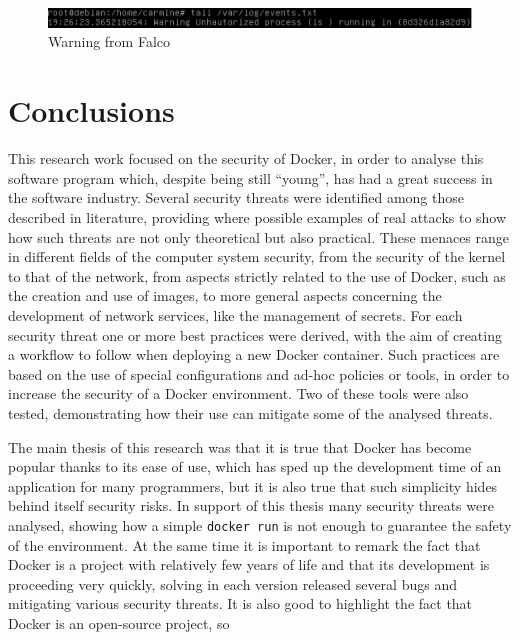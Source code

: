 \documentclass[a4paper,12pt]{article}
\newcommand{\code}[1]{\lstinline|#1|}
\begin{document}
\begin{figure}[ht!]
  \centerline{\includegraphics[width=1\textwidth]{falco_warn.png}}
  \caption{Warning from Falco}
  \label{fig:falco_warn}
\end{figure}
  
\newpage

\section{Conclusions}
\label{sec:conclusions}

This research work focused on the security of Docker, in order to analyse this
software program which, despite being still ``young'', has had a great success
in the software industry. Several security threats were identified among those
described in literature, providing where possible examples of real attacks to
show how such threats are not only theoretical but also practical. These menaces
range in different fields of the computer system security, from the security of
the kernel to that of the network, from aspects strictly related to the use of
Docker, such as the creation and use of images, to more general aspects
concerning the development of network services, like the management of secrets.
For each security threat one or more best practices were derived, with the aim
of creating a workflow to follow when deploying a new Docker container. Such
practices are based on the use of special configurations and ad-hoc policies or
tools, in order to increase the security of a Docker environment. Two of these
tools were also tested, demonstrating how their use can mitigate some of the
analysed threats. \par The main thesis of this research was that it is true that
Docker has become popular thanks to its ease of use, which has sped up the
development time of an application for many programmers, but it is also true
that such simplicity hides behind itself security risks. In support of this
thesis many security threats were analysed, showing how a simple \code{docker
run} is not enough to guarantee the safety of the environment. At the same time
it is important to remark the fact that Docker is a project with relatively few
years of life and that its development is proceeding very quickly, solving in
each version released several bugs and mitigating various security threats. It
is also good to highlight the fact that Docker is an open-source project, so
\end{document}
